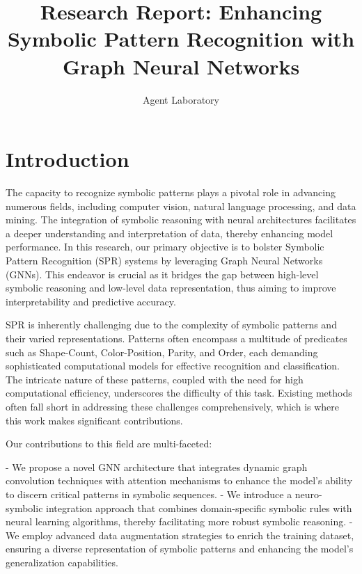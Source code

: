 \documentclass{article}
\title{Research Report: Enhancing Symbolic Pattern Recognition with Graph Neural Networks}
\author{Agent Laboratory}
\begin{document}
\maketitle

\begin{abstract}

\end{abstract}

\section{Introduction}
The capacity to recognize symbolic patterns plays a pivotal role in advancing numerous fields, including computer vision, natural language processing, and data mining. The integration of symbolic reasoning with neural architectures facilitates a deeper understanding and interpretation of data, thereby enhancing model performance. In this research, our primary objective is to bolster Symbolic Pattern Recognition (SPR) systems by leveraging Graph Neural Networks (GNNs). This endeavor is crucial as it bridges the gap between high-level symbolic reasoning and low-level data representation, thus aiming to improve interpretability and predictive accuracy.

SPR is inherently challenging due to the complexity of symbolic patterns and their varied representations. Patterns often encompass a multitude of predicates such as Shape-Count, Color-Position, Parity, and Order, each demanding sophisticated computational models for effective recognition and classification. The intricate nature of these patterns, coupled with the need for high computational efficiency, underscores the difficulty of this task. Existing methods often fall short in addressing these challenges comprehensively, which is where this work makes significant contributions.

Our contributions to this field are multi-faceted:

- We propose a novel GNN architecture that integrates dynamic graph convolution techniques with attention mechanisms to enhance the model's ability to discern critical patterns in symbolic sequences.
- We introduce a neuro-symbolic integration approach that combines domain-specific symbolic rules with neural learning algorithms, thereby facilitating more robust symbolic reasoning.
- We employ advanced data augmentation strategies to enrich the training dataset, ensuring a diverse representation of symbolic patterns and enhancing the model's generalization capabilities.
\end{document}
